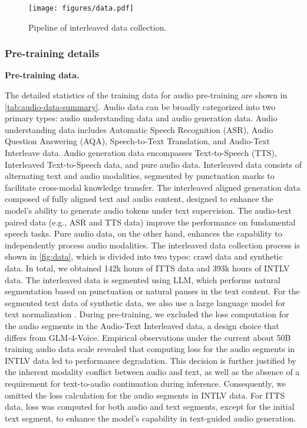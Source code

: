 \begin{figure*}[htb]
  \centering
  \texttt{[image: figures/data.pdf]}
  \caption{Pipeline of interleaved data collection.}
  \label{fig:data}
\end{figure*}
\subsubsection{Pre-training details}
\textbf{Pre-training data.}

The detailed statistics of the training data for audio pre-training are shown in \autoref{tab:audio-data-summary}. Audio data can be broadly categorized into two primary types: audio understanding data and audio generation data. Audio understanding data includes Automatic Speech Recognition (ASR), Audio Question Answering (AQA), Speech-to-Text Translation, and Audio-Text Interleave data. Audio generation data encompasses Text-to-Speech (TTS), Interleaved Text-to-Speech data, and pure audio data. Interleaved data consists of alternating text and audio modalities, segmented by punctuation marks to facilitate cross-modal knowledge transfer. The interleaved aligned generation data composed of fully aligned text and audio content, designed to enhance the model’s ability to generate audio tokens under text supervision. The audio-text paired data (e.g., ASR and TTS data) improve the performance on fundamental speech tasks. Pure audio data, on the other hand, enhances the capability to independently process audio modalities. The interleaved data collection process is shown in \autoref{fig:data}, which is divided into two types: crawl data and synthetic data. In total, we obtained 142k hours of ITTS data and 393k hours of INTLV data. The interleaved data is segmented using LLM, which performs natural segmentation based on punctuation or natural pauses in the text content. For the segmented text data of synthetic data, we also use a large language model for text normalization \cite{zhang2024chat}. During pre-training, we excluded the loss computation for the audio segments in the Audio-Text Interleaved data, a design choice that differs from GLM-4-Voice. Empirical observations under the current about 50B training audio data scale revealed that computing loss for the audio segments in INTLV data led to performance degradation. This decision is further justified by the inherent modality conflict between audio and text, as well as the absence of a requirement for text-to-audio continuation during inference. Consequently, we omitted the loss calculation for the audio segments in INTLV data. For ITTS data, loss was computed for both audio and text segments, except for the initial text segment, to enhance the model's capability in text-guided audio generation.



